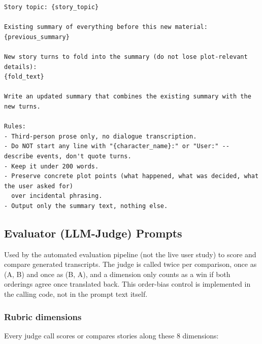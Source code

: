 \begin{lstlisting}
Story topic: {story_topic}

Existing summary of everything before this new material:
{previous_summary}

New story turns to fold into the summary (do not lose plot-relevant details):
{fold_text}

Write an updated summary that combines the existing summary with the new turns.

Rules:
- Third-person prose only, no dialogue transcription.
- Do NOT start any line with "{character_name}:" or "User:" -- describe events, don't quote turns.
- Keep it under 200 words.
- Preserve concrete plot points (what happened, what was decided, what the user asked for)
  over incidental phrasing.
- Output only the summary text, nothing else.
\end{lstlisting}

\subsection{Evaluator (LLM-Judge) Prompts}
\label{app:evaluator-prompts}

Used by the automated evaluation pipeline (not the live user study) to score
and compare generated transcripts. The judge is called twice per comparison,
once as (A, B) and once as (B, A), and a dimension only counts as a win
if both orderings agree once translated back. This order-bias control is
implemented in the calling code, not in the prompt text itself.

\subsubsection{Rubric dimensions}

Every judge call scores or compares stories along these 8 dimensions:

